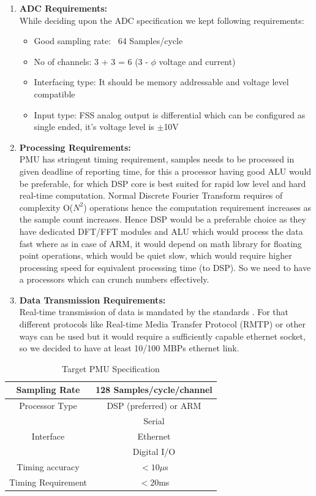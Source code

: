 \begin{enumerate}
	\item \textbf{ADC Requirements:}\\
	While deciding upon the ADC specification we kept following requirements: 
	\begin{itemize}
		\item Good sampling rate: ~64 Samples/cycle
		\item No of channels: 3 + 3 = 6 (3 - $\phi$ voltage and current) 
		\item Interfacing type: It should be memory addressable and voltage level compatible
		\item Input type: FSS analog output is differential which can be configured as single ended, it's voltage level is $\pm$10V
	\end{itemize}
	
	\item \textbf{Processing Requirements:}\\
	PMU has stringent timing requirement, samples needs to be processed in given deadline of reporting time, for this a processor having good ALU would be preferable, for which DSP core is best suited for rapid low level and hard real-time computation. Normal Discrete Fourier Transform requires of complexity O($N^{2}$) operations hence the computation requirement increases as the sample count increases. Hence DSP would be a preferable choice as they have dedicated DFT/FFT modules and ALU which would process the data fast  where as in case of ARM, it would depend on math library for floating point operations, which would be quiet slow, which would require higher processing speed for equivalent processing time (to DSP). So we need to have a processors which can crunch numbers effectively.   
	
	\item \textbf{Data Transmission Requirements:}\\
	Real-time transmission of data is mandated by the standards \cite{c37.118}. For that different protocols like Real-time  Media Transfer Protocol (RMTP) or other ways can be used but it would require a sufficiently capable ethernet socket, so we decided to have at least 10/100 MBPs ethernet link.
\end{enumerate}

\begin{table}
	\caption{Target PMU Specification}
	\centering
	\begin{tabular}{|c|c|}
		\hline
		Sampling Rate & 128 Samples/cycle/channel \\ 
		\hline
		Processor Type & DSP (preferred) or ARM \\
		\hline
		\multirow{3}{*}{Interface}& Serial \\
								& Ethernet \\
								& Digital I/O \\
								\hline
		Timing accuracy & $< 10 \mu$s \\
		\hline
		Timing Requirement & $< 20$ms \\
		\hline
	\end{tabular}
\label{tab:specs}
\end{table}



